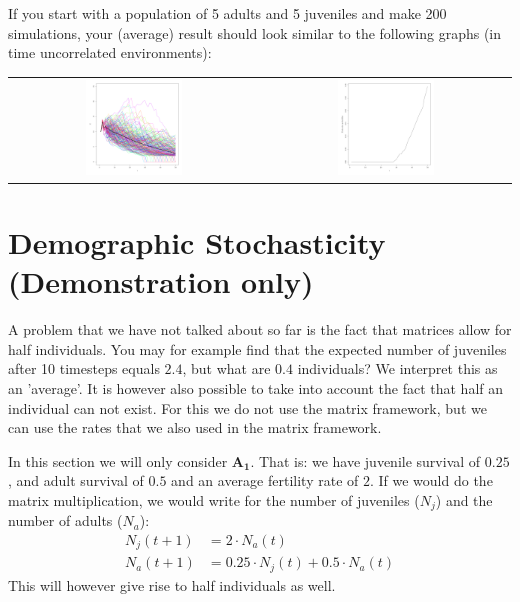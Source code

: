 \documentclass{article}\usepackage[]{graphicx}\usepackage[]{color}
\begin{document}
If you start with a population of 5 adults and 5 juveniles and make 200 simulations, your (average) result should look similar to the following graphs (in time uncorrelated environments):
\begin{center}
\begin{tabular}{c c}

\includegraphics[width=0.40\textwidth]{figure/simop-1} 
 & 
\includegraphics[width=0.40\textwidth]{figure/simop-2} 

\end{tabular}
\end{center}
\section{Demographic Stochasticity (Demonstration only)}
A problem that we have not talked about so far is the fact that matrices allow for half individuals. You may for example find that the expected number of juveniles after 10 timesteps equals $2.4$, but what are $0.4$ individuals? We interpret this as an 'average'. It is however also possible to take into account the fact that half an individual can not exist. For this we do not use the matrix framework, but we can use the rates that we also used in the matrix framework.

In this section we will only consider $\boldsymbol{A_1}$. That is: we have juvenile survival of $0.25$, and adult survival of $0.5$ and an average fertility rate of $2$. If we would do the matrix multiplication, we would write for the number of juveniles ($N_j$) and the number of adults ($N_a$):
\begin{align*}
N_j(t+1) &= 2\cdot N_a (t)\\
N_a(t+1) &= 0.25\cdot N_j(t) + 0.5\cdot N_a(t)
\end{align*}
This will however give rise to half individuals as well.
\end{document}
